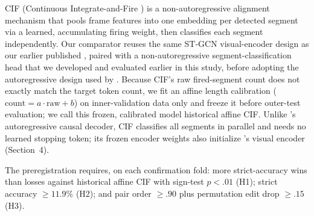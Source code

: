 CIF (Continuous Integrate-and-Fire \citep{dong2020cif}) is a non-autoregressive
alignment mechanism that pools frame features into one embedding per detected
segment via a learned, accumulating firing weight, then classifies each segment
independently.  Our comparator reuses the same ST-GCN visual-encoder design as
our earlier published \system{} \citep{velasquez2026imitator}, paired with a
non-autoregressive segment-classification head that we developed and evaluated
earlier in this study, before adopting the autoregressive design used by
\ImitatorEOne{}.  Because CIF's raw fired-segment count does not exactly match
the target token count, we fit an affine length calibration
($\mathrm{count}=a\cdot\mathrm{raw}+b$) on inner-validation data only and freeze
it before outer-test evaluation; we call this frozen, calibrated model
historical affine CIF.  Unlike \ImitatorEOne{}'s autoregressive causal decoder,
CIF classifies all segments in parallel and needs no learned stopping token; its
frozen encoder weights also initialize \ImitatorEOne{}'s visual encoder
(Section~4).

The preregistration requires, on each confirmation fold: more strict-accuracy wins
than losses against historical affine CIF with sign-test $p<.01$ (H1); strict
accuracy $\geq11.9\%$ (H2); and pair order $\geq.90$ plus permutation edit drop
$\geq.15$ (H3).
